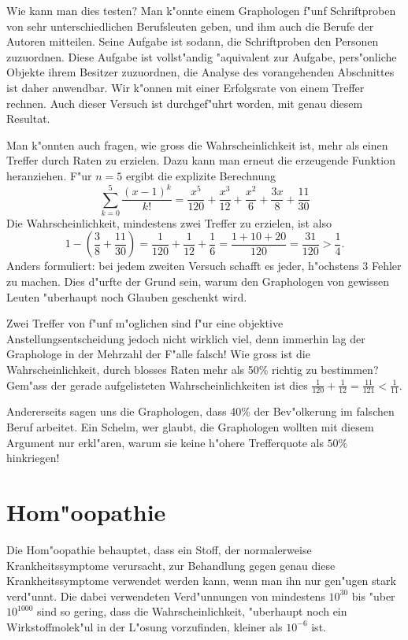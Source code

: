 Wie kann man dies testen? Man k"onnte einem Graphologen f"unf Schriftproben
von sehr unterschiedlichen Berufsleuten geben, und ihm auch die Berufe
der Autoren mitteilen. Seine Aufgabe ist sodann, die Schriftproben den
Personen zuzuordnen. Diese Aufgabe ist vollst"andig "aquivalent zur Aufgabe,
pers"onliche Objekte ihrem Besitzer zuzuordnen, die Analyse des vorangehenden
Abschnittes ist daher anwendbar. Wir k"onnen mit einer Erfolgsrate von einem
Treffer rechnen. Auch dieser Versuch ist durchgef"uhrt worden, mit genau
diesem Resultat.

Man k"onnten auch fragen, wie gross die Wahrscheinlichkeit ist, mehr als einen
Treffer durch Raten zu erzielen.
Dazu kann man erneut die erzeugende Funktion
heranziehen. F"ur $n=5$ ergibt die explizite Berechnung
$$\sum_{k=0}^5\frac{(x-1)^k}{k!}
=\frac{x^5}{120}+\frac{x^3}{12}+\frac{x^2}{6}+\frac{3 x}{8}+\frac{11}{30}
$$
Die Wahrscheinlichkeit, mindestens zwei Treffer zu erzielen, ist also
$$1-\left(\frac38+\frac{11}{30}\right)=\frac1{120}+\frac1{12}+\frac16=\frac{1+10+20}{120}=\frac{31}{120}>\frac14.$$
Anders formuliert: bei jedem zweiten Versuch schafft es jeder, h"ochstens $3$
Fehler zu machen. Dies d"urfte der Grund sein, warum den Graphologen
von gewissen Leuten "uberhaupt noch Glauben geschenkt wird.

Zwei Treffer von f"unf m"oglichen sind f"ur eine objektive Anstellungsentscheidung
jedoch nicht wirklich viel, denn immerhin lag der Graphologe in der Mehrzahl
der F"alle falsch! Wie gross ist die Wahrscheinlichkeit, durch blosses Raten
mehr als 50\% richtig zu bestimmen? Gem"ass der gerade
aufgelisteten Wahrscheinlichkeiten ist dies
$\frac1{120}+\frac1{12}=\frac{11}{121}<\frac1{11}$.

Andererseits sagen uns die Graphologen, dass 40\% der Bev"olkerung im falschen
Beruf arbeitet.
Ein Schelm, wer glaubt,
die Graphologen wollten mit diesem
Argument nur erkl"aren, warum sie keine h"ohere Trefferquote als $50\%$ hinkriegen!


\section{Hom"oopathie}
Die Hom"oopathie behauptet, dass ein Stoff, der normalerweise Krankheitssymptome
verursacht, zur Behandlung gegen genau diese Krankheitssymptome verwendet werden
kann, wenn man ihn nur gen"ugen stark verd"unnt. Die dabei verwendeten
Verd"unnungen von mindestens $10^{30}$ bis "uber $10^{1000}$ sind so gering,
dass die Wahrscheinlichkeit, "uberhaupt noch ein Wirkstoffmolek"ul in der
L"osung vorzufinden, kleiner als $10^{-6}$ ist.

